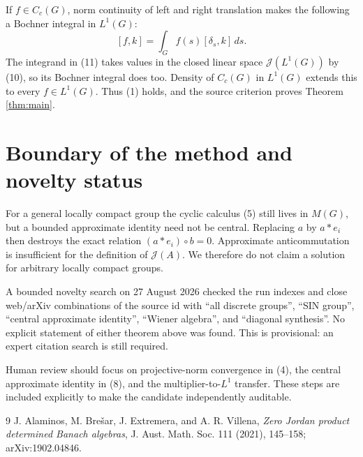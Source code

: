 \documentclass[10pt]{article}
\newcommand{\JJ}{\mathcal J}
\begin{document}
If $f\in C_c(G)$, norm continuity of left and right translation makes the
following a Bochner integral in $L^1(G)$:
\[
 [f,k]=\int_G f(s)[\delta_s,k]\,ds.                        \tag{11}
\]
The integrand in (11) takes values in the closed linear space
$\JJ(L^1(G))$ by (10), so its Bochner integral does too.  Density of
$C_c(G)$ in $L^1(G)$ extends this to every $f\in L^1(G)$.  Thus (1) holds,
and the source criterion proves Theorem \ref{thm:main}.

\section*{Boundary of the method and novelty status}
\enlargethispage{3\baselineskip}

For a general locally compact group the cyclic calculus (5) still lives in
$M(G)$, but a bounded approximate identity need not be central.  Replacing
$a$ by $a*e_i$ then destroys the exact relation
$(a*e_i)\circ b=0$.  Approximate anticommutation is insufficient for the
definition of $\JJ(A)$.  We therefore do not claim a solution for arbitrary
locally compact groups.

A bounded novelty search on 27 August 2026 checked the run indexes and close
web/arXiv combinations of the source id with ``all discrete groups'', ``SIN
group'', ``central approximate identity'', ``Wiener algebra'', and
``diagonal synthesis''.  No explicit statement of either theorem above was
found.  This is provisional: an expert citation search is still required.

Human review should focus on projective-norm convergence in (4), the central
approximate identity in (8), and the multiplier-to-$L^1$ transfer.  These
steps are included explicitly to make the candidate independently auditable.

\begin{thebibliography}{9}
J. Alaminos, M. Bre\v{s}ar, J. Extremera, and A. R. Villena,
\emph{Zero Jordan product determined Banach algebras}, J. Aust. Math. Soc.
111 (2021), 145--158; arXiv:1902.04846.
\end{thebibliography}
\end{document}
